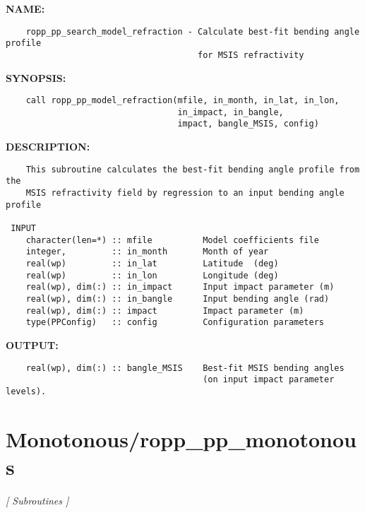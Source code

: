 \label{ch:robo41}
\label{ch:ModelRefraction_ropp_pp_search_model_refraction}
\textbf{NAME:}\hspace{0.08in}\begin{Verbatim}
    ropp_pp_search_model_refraction - Calculate best-fit bending angle profile
                                      for MSIS refractivity
\end{Verbatim}
\textbf{SYNOPSIS:}\hspace{0.08in}\begin{Verbatim}
    call ropp_pp_model_refraction(mfile, in_month, in_lat, in_lon, 
                                  in_impact, in_bangle, 
                                  impact, bangle_MSIS, config)
\end{Verbatim}
\textbf{DESCRIPTION:}\hspace{0.08in}\begin{Verbatim}
    This subroutine calculates the best-fit bending angle profile from the
    MSIS refractivity field by regression to an input bending angle profile 

 INPUT
    character(len=*) :: mfile          Model coefficients file
    integer,         :: in_month       Month of year
    real(wp)         :: in_lat         Latitude  (deg)
    real(wp)         :: in_lon         Longitude (deg)
    real(wp), dim(:) :: in_impact      Input impact parameter (m)
    real(wp), dim(:) :: in_bangle      Input bending angle (rad)
    real(wp), dim(:) :: impact         Impact parameter (m)
    type(PPConfig)   :: config         Configuration parameters
\end{Verbatim}
\textbf{OUTPUT:}\hspace{0.08in}\begin{Verbatim}
    real(wp), dim(:) :: bangle_MSIS    Best-fit MSIS bending angles 
                                       (on input impact parameter levels).
\end{Verbatim}
\section{Monotonous/ropp\_pp\_monotonous}
\textsl{[ Subroutines ]}

